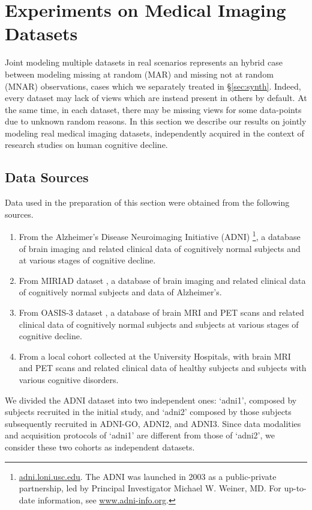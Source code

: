 \section{Experiments on Medical Imaging Datasets}
\label{sec:real}


% 
% 



% 

Joint modeling multiple datasets in real scenarios represents an hybrid case between modeling missing at random (MAR) and missing not at random (MNAR) observations, cases which we separately treated in \S\ref{sec:synth}.
Indeed, every dataset may lack of views which are instead present in others by default.
At the same time, in each dataset, there may be missing views for some data-points due to unknown random reasons.
In this section we describe our results on jointly modeling real medical imaging datasets, independently acquired in the context of research studies on human cognitive decline.

\subsection{Data Sources}
Data used in the preparation of this section were obtained from the following sources.
\begin{enumerate}
%
\item From the Alzheimer's Disease Neuroimaging Initiative (ADNI)
\footnote{
\href{http://adni.loni.usc.edu}{adni.loni.usc.edu}.
The ADNI was launched in 2003 as a public-private partnership, led by Principal Investigator Michael W. Weiner, MD. For up-to-date information, see \href{www.adni-info.org}{www.adni-info.org}.
},
a database of brain imaging and related clinical data of cognitively normal subjects and at various stages of cognitive decline.
%
\item From MIRIAD dataset \cite{Miriad}, a database of brain imaging and related clinical data of cognitively normal subjects and data of Alzheimer's.
%
\item From OASIS-3 dataset \citep{oasis3}, a database of brain MRI and PET scans and related clinical data of cognitively normal subjects and subjects at various stages of cognitive decline.
%
\item From a local cohort collected at the University Hospitals, with brain MRI and PET scans and related clinical data of healthy subjects and subjects with various cognitive disorders.
\end{enumerate}
We divided the ADNI dataset into two independent ones:
`adni1', composed by subjects recruited in the initial study,
and `adni2' composed by those subjects subsequently recruited in ADNI-GO, ADNI2, and ADNI3.
Since data modalities and acquisition protocols of `adni1' are different from those of `adni2', we consider these two cohorts as independent datasets.

